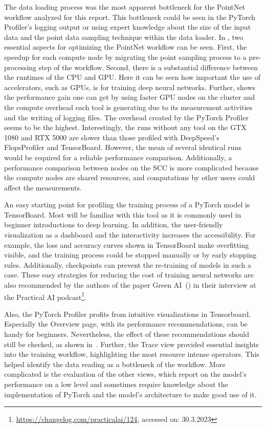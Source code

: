 \documentclass[12pt, a4paper, hidelinks]{article}
\begin{document}
The data loading process was the most apparent bottleneck for the PointNet workflow analyzed for this report. This bottleneck could be seen in the PyTorch Profiler's logging output or using expert knowledge about the size of the input data and the point data sampling technique within the data loader. 
In , two essential aspects for optimizing the PointNet workflow can be seen. First, the speedup for each compute node by migrating the point sampling process to a pre-processing step of the workflow. Second, there is a substantial difference between the runtimes of the \ac{CPU} and \ac{GPU}. Here it can be seen how important the use of accelerators, such as \ac{GPU}s, is for training deep neural networks.
Further,  shows the performance gain one can get by using faster \ac{GPU} nodes on the cluster and the compute overhead each tool is generating due to its measurement activities and the writing of logging files. The overhead created by the PyTorch Profiler seems to be the highest. Interestingly, the runs without any tool on the GTX 1080 and RTX 5000 are slower than those profiled with DeepSpeed's FlopsProfiler and TensorBoard.
However, the mean of several identical runs would be required for a reliable performance comparison. Additionally, a performance comparison between nodes on the \ac{SCC} is more complicated because the compute nodes are shared resources, and computations by other users could affect the measurements. 

An easy starting point for profiling the training process of a PyTorch model is TensorBoard. Most will be familiar with this tool as it is commonly used in beginner introductions to deep learning. In addition, the user-friendly visualization as a dashboard and the interactivity increases the accessibility.
For example, the loss and accuracy curves shown in TensorBoard make overfitting visible, and the training process could be stopped manually or by early stopping rules. Additionally, checkpoints can prevent the re-training of models in such a case. These easy strategies for reducing the cost of training neural networks are also recommended by the authors of the paper Green AI~(\cite{schwartz_2019_greenai}) in their interview at the Practical AI podcast\footnote{\url{https://changelog.com/practicalai/124}, accessed on: 30.3.2023}.

Also, the PyTorch Profiler profits from intuitive visualizations in Tensorboard.
Especially the Overview page, with its performance recommendations, can be handy for beginners. Nevertheless, the effect of these recommendations should still be checked, as shown in~.
Further, the Trace view provided essential insights into the training workflow, highlighting the most resource intense operators. This helped identify the data reading as a bottleneck of the workflow.
More complicated is the evaluation of the other views, which report on the model's performance on a low level and sometimes require knowledge about the implementation of PyTorch and the model's architecture to make good use of it. 
\end{document}
